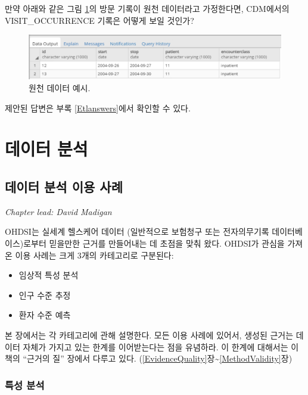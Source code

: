 \documentclass[10.5pt]{book}
\providecommand{\tightlist}{%
  \setlength{\itemsep}{0pt}\setlength{\parskip}{0pt}}
\theoremstyle{definition}
\theoremstyle{definition}
\theoremstyle{definition}
\theoremstyle{remark}
\begin{document}
만약 아래와 같은 그림 \ref{fig:exerciseSourceData}의 방문 기록이 원천
데이터라고 가정한다면, CDM에서의 VISIT\_OCCURRENCE 기록은 어떻게 보일
것인가?

\begin{figure}

{\centering \includegraphics[width=1\linewidth]{images/ExtractTransformLoad/exerciseSourceData} 

}

\caption{원천 데이터 예시.}\label{fig:exerciseSourceData}
\end{figure}

제안된 답변은 부록 \ref{Etlanswers}에서 확인할 수 있다.

\part{데이터 분석}\label{part--}

\chapter{데이터 분석 이용 사례}\label{DataAnalyticsUseCases}

\emph{Chapter lead: David Madigan}

OHDSI는 실세계 헬스케어 데이터 (일반적으로 보험청구 또는 전자의무기록
데이터베이스)로부터 믿을만한 근거를 만들어내는 데 초점을 맞춰 왔다.
OHDSI가 관심을 가져온 이용 사례는 크게 3개의 카테고리로 구분된다:

\begin{itemize}
\tightlist
\item
  임상적 특성 분석
\item
  인구 수준 추정
\item
  환자 수준 예측
\end{itemize}

본 장에서는 각 카테고리에 관해 설명한다. 모든 이용 사례에 있어서, 생성된
근거는 데이터 자체가 가지고 있는 한계를 이어받는다는 점을 유념하라. 이
한계에 대해서는 이 책의 ``근거의 질'' 장에서 다루고 있다.
(\ref{EvidenceQuality}장\textasciitilde{}\ref{MethodValidity}장)

\section{특성 분석}\label{-}
\end{document}
